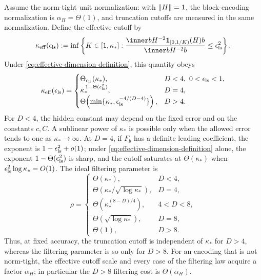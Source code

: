 \begin{theorem}
\label{thm:spectral-dimension-laws}
Assume the norm-tight unit normalization: with $\lVert H\rVert=1$, the
block-encoding normalization is $\alpha_H=\Theta(1)$, and truncation cutoffs
are measured in the same normalization.  Define the effective cutoff by
\begin{equation}
 \kappa_{\rm eff}(\epsilon_{\rm ls})
 :=\inf\left\{K\in[1,\kappa_*]:
 \frac{\inner b{H^{-2}\mathbf1_{[0,1/K)}(H)b}}{\inner b{H^{-2}b}}
 \leq\epsilon_{\rm ls}^2\right\}.
 \label{eq:dls-effective-cutoff-definition}
\end{equation}
Under \eqref{eq:effective-dimension-definition}, this quantity obeys
\begin{equation}
 \kappa_{\rm eff}(\epsilon_{\rm ls})=
 \begin{cases}
  \Theta_{\epsilon_{\rm ls}}(\kappa_*),&D<4,\ 0<\epsilon_{\rm ls}<1,\\
  \kappa_*^{\,1-\Theta(\epsilon_{\rm ls}^2)},&D=4,\\
  \Theta\!\left(\min\{\kappa_*,
                  \epsilon_{\rm ls}^{-4/(D-4)}\}\right),&D>4.
 \end{cases}
 \label{eq:dls-truncation-dimension-law}
\end{equation}
For $D<4$, the hidden constant may depend on the fixed error and on the
constants $c,C$.  A sublinear power of $\kappa_*$ is possible only
when the allowed error tends to one as $\kappa_*\to\infty$.  At $D=4$, if $F_b$
has a definite leading coefficient, the exponent is
$1-\epsilon_{\rm ls}^2+o(1)$; under
\eqref{eq:effective-dimension-definition} alone, the exponent
$1-\Theta(\epsilon_{\rm ls}^2)$ is sharp, and the cutoff saturates at
$\Theta(\kappa_*)$ when
$\epsilon_{\rm ls}^2\log\kappa_*=O(1)$.  The ideal filtering
parameter is
\begin{equation}
 \rho=
 \begin{cases}
  \Theta(\kappa_*),&D<4,\\
  \Theta(\kappa_*/\sqrt{\log\kappa_*}),&D=4,\\
  \Theta(\kappa_*^{(8-D)/4}),&4<D<8,\\
  \Theta(\sqrt{\log\kappa_*}),&D=8,\\
  \Theta(1),&D>8.
 \end{cases}
 \label{eq:dls-filter-dimension-law}
\end{equation}
Thus, at fixed accuracy, the truncation cutoff is independent of $\kappa_*$
for $D>4$, whereas the filtering parameter is so only for $D>8$.  For an
encoding that is not norm-tight, the effective cutoff scale and every case
of the filtering law acquire a factor $\alpha_H$; in particular the $D>8$
filtering cost is $\Theta(\alpha_H)$.
\end{theorem}

